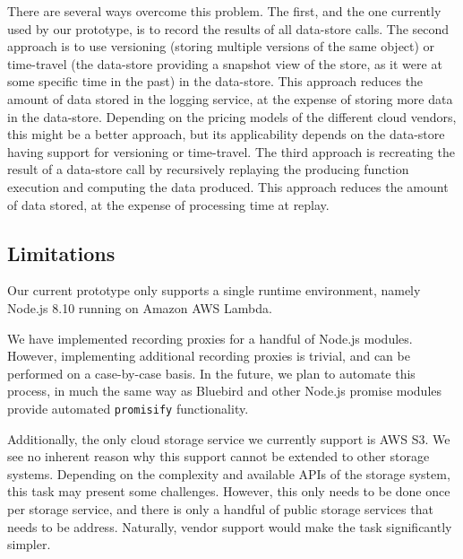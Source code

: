 There are several ways overcome this problem. The first, and the one currently
used by our prototype, is to record the results of all data-store calls. The
second approach is to use versioning (storing multiple versions of the same
object) or time-travel (the data-store providing a snapshot view of the store,
as it were at some specific time in the past) in the data-store. This approach
reduces the amount of data stored in the logging service, at the expense of
storing more data in the data-store. Depending on the pricing models of the
different cloud vendors, this might be a better approach, but its applicability
depends on the data-store having support for versioning or time-travel. The
third approach is recreating the result of a data-store call by recursively
replaying the producing function execution and computing the data produced. This
approach reduces the amount of data stored, at the expense of processing time at
replay.

\subsection{Limitations}
Our current prototype only supports a single runtime environment, namely
Node.js 8.10 running on Amazon AWS Lambda.

We have implemented recording proxies for a handful of Node.js modules.
However, implementing additional recording proxies is trivial, and can be
performed on a case-by-case basis. In the future, we plan to automate this
process, in much the same way as Bluebird and other Node.js promise modules
provide automated \verb|promisify| functionality.

Additionally, the only cloud storage service we currently support is AWS S3. We
see no inherent reason why this support cannot be extended to other storage
systems. Depending on the complexity and available APIs of the storage system,
this task may present some challenges. However, this only needs to be done once
per storage service, and there is only a handful of public storage services
that needs to be address. Naturally, vendor support would make the task
significantly simpler.



